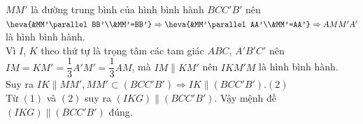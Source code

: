 \begin{ex}
{\begin{itemchoice}
			\itemch $ MM'$ là đường trung bình của hình bình hành $ BCC'B'$ nên\\
			$\heva{&MM'\parallel BB'\\&MM'=BB'}
				\Rightarrow\heva{&MM'\parallel AA'\\&MM'=AA'}
					\Rightarrow AMM'A'$ là hình bình hành.\\
			Vì $ I$, $K$ theo thứ tự là trọng tâm các tam giác $ ABC$, $A'B'C'$ nên\\
			$ IM=KM'=\dfrac{1}{3}A'M'=\dfrac{1}{3}AM$, mà $ IM\parallel KM'$ nên $ IKM'M$ là hình bình hành.\\
			Suy ra $ IK\parallel MM',MM'\subset\left(BCC'B'\right)\Rightarrow IK\parallel \left(BCC'B'\right)$.\hfill $(2)$\\
			Từ $(1)$ và $(2)$ suy ra $ (IKG)\parallel \left(BCC'B'\right)$. Vậy mệnh đề $ (IKG)\parallel \left(BCC'B'\right)$ đúng.
		\end{itemchoice}
	}	
\end{ex}

